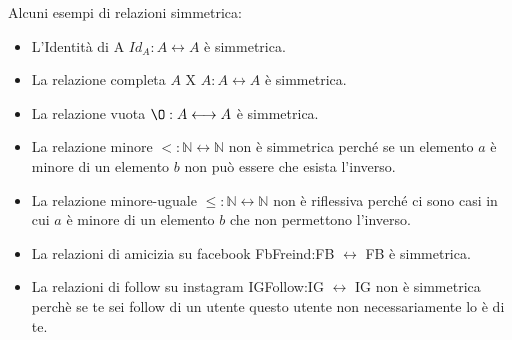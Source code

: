 \begin{example}
Alcuni esempi di relazioni simmetrica:
    \begin{itemize}
        \item L'Identità di A $Id_A: A \longleftrightarrow A$ è simmetrica.
        \item La relazione completa $A$ X $A:A \longleftrightarrow A$ è simmetrica.
        \item La relazione vuota $\O: A \longleftrightarrow A$ è simmetrica.
        \item La relazione minore $<: \mathbb{N} \longleftrightarrow \mathbb{N}$ non è simmetrica perché se un elemento $a$ è minore di un elemento $b$ non può essere che esista l'inverso.
        \item La relazione minore-uguale $\leq: \mathbb{N} \longleftrightarrow \mathbb{N}$ non è riflessiva perché ci sono casi in cui $a$ è minore di un elemento $b$ che non permettono l'inverso.
        \item La relazioni di amicizia su facebook FbFreind:FB $\longleftrightarrow$ FB è simmetrica.
        \item La relazioni di follow su instagram IGFollow:IG $\longleftrightarrow$ IG non è simmetrica perchè se te sei follow di un utente questo utente non necessariamente lo è di te.
    \end{itemize}
\end{example}

